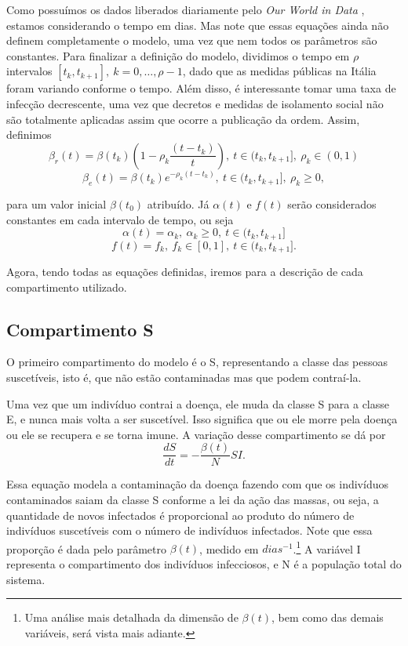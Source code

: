 \documentclass{article}
\begin{document}
Como possuímos os dados liberados diariamente pelo \textit{Our World in Data} \cite{owid}, estamos considerando o tempo em dias. Mas note que essas equações ainda não definem completamente o modelo, uma vez que nem todos os parâmetros são constantes. Para finalizar a definição do modelo, dividimos o tempo em $\rho$ intervalos $[t_k, t_{k + 1}], ~k = 0, \dots, \rho -1$, dado que as medidas públicas na Itália foram variando conforme o tempo. Além disso, é interessante tomar uma taxa de infecção decrescente, uma vez que decretos e medidas de isolamento social não são totalmente aplicadas assim que ocorre a publicação da ordem. Assim, definimos
\[\beta_r(t) = \beta(t_k)\left(1 - \rho_k\dfrac{(t - t_k)}{t}\right), ~t \in (t_k, t_{k + 1}], ~\rho_k \in (0, 1)\]
\[\beta_e(t) = \beta(t_k)e^{- \rho_k(t - t_k)}, ~t \in (t_k, t_{k + 1}], ~\rho_k \geq 0,\]

\noindent para um valor inicial $\beta(t_0)$ atribuído. Já $\alpha(t)$ e $f(t)$ serão considerados constantes em cada intervalo de tempo, ou seja
\[\alpha(t) = \alpha_k, ~\alpha_k \geq 0, ~t \in (t_k, t_{k + 1}]\]
\[f(t) = f_k, ~f_k \in [0, 1], ~t \in (t_k, t_{k + 1}].\]

Agora, tendo todas as equações definidas, iremos para a descrição de cada compartimento utilizado.

\subsection{Compartimento S}

O primeiro compartimento do modelo é o S, representando a classe das pessoas suscetíveis, isto é, que não estão contaminadas mas que podem contraí-la.

Uma vez que um indivíduo contrai a doença, ele muda da classe S para a classe E, e nunca mais volta a ser suscetível. Isso significa que ou ele morre pela doença ou ele se recupera e se torna imune. A variação desse compartimento se dá por
\[\dfrac{dS}{dt} = -\dfrac{\beta(t)}{N}SI.\]

Essa equação modela a contaminação da doença fazendo com que os indivíduos contaminados saiam da classe S conforme a lei da ação das massas, ou seja, a quantidade de novos infectados é proporcional ao produto do número de indivíduos suscetíveis com o número de indivíduos infectados. Note que essa proporção é dada pelo parâmetro $\beta(t)$, medido em $dias^{-1}$.\footnote{Uma análise mais detalhada da dimensão de $\beta(t)$, bem como das demais variáveis, será vista %
mais adiante.} A variável I representa o compartimento dos indivíduos infecciosos, e N é a população total do sistema.
\end{document}
